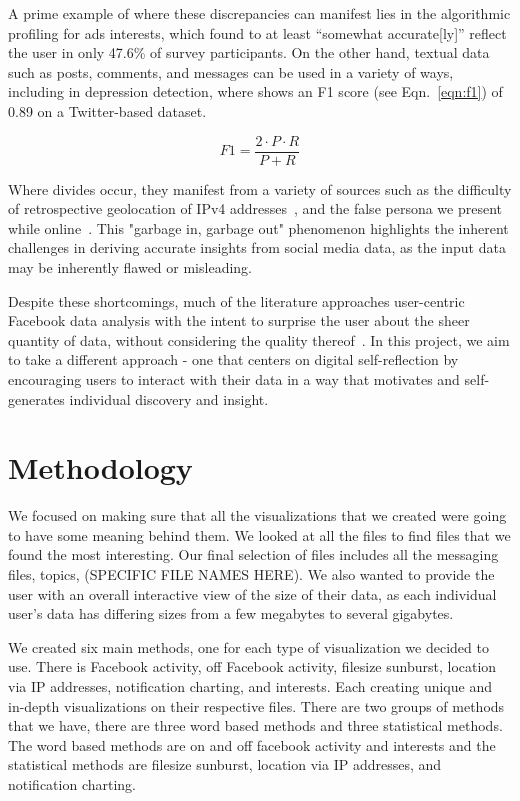 \documentclass[conference, letterpaper, 11pt]{IEEEtran}
\begin{document}
A prime example of where these discrepancies can manifest lies in the algorithmic profiling for ads interests, which \cite{algprof} found to at least “somewhat accurate[ly]” reflect the user in only 47.6\% of survey participants. On the other hand, textual data such as posts, comments, and messages can be used in a variety of ways, including in depression detection, where \cite{depression} shows an F1 score (see Eqn.~\ref{eqn:f1}) of 0.89 on a Twitter-based dataset.

\begin{equation}
    F1 = \frac{2 \cdot P \cdot R}{P + R}\label{eqn:f1}
\end{equation}

Where divides occur, they manifest from a variety of sources such as the difficulty of retrospective geolocation of IPv4 addresses~\cite{ipgeo}, and the false persona we present while online~\cite{fbself}. This "garbage in, garbage out" phenomenon highlights the inherent challenges in deriving accurate insights from social media data, as the input data may be inherently flawed or misleading.

Despite these shortcomings, much of the literature approaches user-centric Facebook data analysis with the intent to surprise the user about the sheer quantity of data, without considering the quality thereof~\cite{surpriv, usercontext}. In this project, we aim to take a different approach - one that centers on digital self-reflection by encouraging users to interact with their data in a way that motivates and self-generates individual discovery and insight.

\section{Methodology} \label{ME}

We focused on making sure that all the visualizations that we created were going to have some meaning behind them. We looked at all the files to find files that we found the most interesting. Our final selection of files includes all the messaging files, topics, (SPECIFIC FILE NAMES HERE). We also wanted to provide the user with an overall interactive view of the size of their data, as each individual user’s data has differing sizes from a few megabytes to several gigabytes. 

We created six main methods, one for each type of visualization we decided to use. There is Facebook activity, off Facebook activity, filesize sunburst, location via IP addresses, notification charting, and interests. Each creating unique and in-depth visualizations on their respective files. There are two groups of methods that we have, there are three word based methods and three statistical methods. The word based methods are on and off facebook activity and interests and the statistical methods are filesize sunburst, location via IP addresses, and notification charting. 
\end{document}
